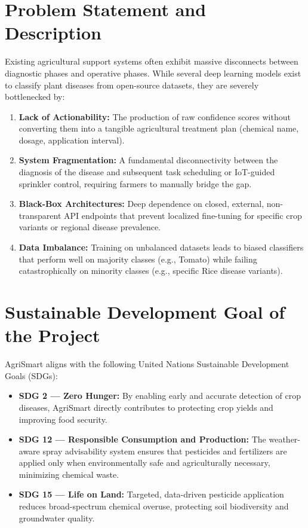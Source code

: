 \documentclass[12pt,a4paper]{report}
\begin{document}
\section{Problem Statement and Description}
Existing agricultural support systems often exhibit massive disconnects between diagnostic phases and operative phases. While several deep learning models exist to classify plant diseases from open-source datasets, they are severely bottlenecked by:

\begin{enumerate}
  \item \textbf{Lack of Actionability:} The production of raw confidence scores without converting them into a tangible agricultural treatment plan (chemical name, dosage, application interval).
  
  \item \textbf{System Fragmentation:} A fundamental disconnectivity between the diagnosis of the disease and subsequent task scheduling or IoT-guided sprinkler control, requiring farmers to manually bridge the gap.
  
  \item \textbf{Black-Box Architectures:} Deep dependence on closed, external, non-transparent API endpoints that prevent localized fine-tuning for specific crop variants or regional disease prevalence.
  
  \item \textbf{Data Imbalance:} Training on unbalanced datasets leads to biased classifiers that perform well on majority classes (e.g., Tomato) while failing catastrophically on minority classes (e.g., specific Rice disease variants).
\end{enumerate}

\section{Sustainable Development Goal of the Project}
AgriSmart aligns with the following United Nations Sustainable Development Goals (SDGs):

\begin{itemize}
  \item \textbf{SDG 2 — Zero Hunger:} By enabling early and accurate detection of crop diseases, AgriSmart directly contributes to protecting crop yields and improving food security.
  
  \item \textbf{SDG 12 — Responsible Consumption and Production:} The weather-aware spray advisability system ensures that pesticides and fertilizers are applied only when environmentally safe and agriculturally necessary, minimizing chemical waste.
  
  \item \textbf{SDG 15 — Life on Land:} Targeted, data-driven pesticide application reduces broad-spectrum chemical overuse, protecting soil biodiversity and groundwater quality.
\end{itemize}
\end{document}
